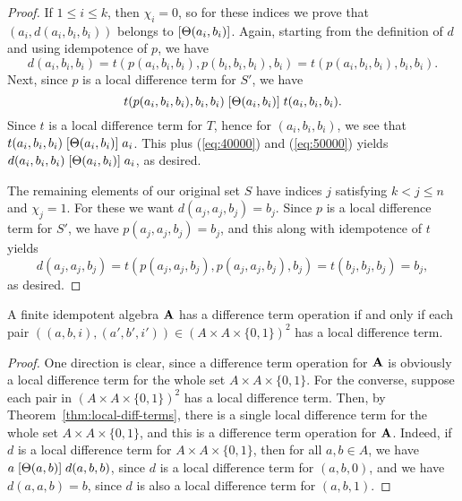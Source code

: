 \begin{proof}
If $1\leq i \leq k$, then $\chi_i =0$, so for these indices we prove
that $(a_i, d(a_i,b_i,b_i))$ belongs to $[\Theta(a_i,b_i)]$.
Again, starting from the definition of $d$ and using idempotence of $p$, we have
\begin{equation}
  \label{eq:40000}
  d(a_i,b_i,b_i) =
  t(p(a_i,b_i,b_i), p(b_i,b_i,b_i), b_i)=
  t(p(a_i,b_i,b_i), b_i, b_i).
\end{equation}
Next, since $p$ is a local difference term for $S'$, we have
\begin{equation}
  \label{eq:50000}
  t(p(a_i,b_i,b_i), b_i, b_i)
 \mathrel{[\Theta(a_i,b_i)]}
 t(a_i, b_i, b_i).
\end{equation}
Since $t$ is a local difference term for $T$, hence for
$(a_i, b_i, b_i)$,  %
we see that
$t(a_i, b_i, b_i) \mathrel{[\Theta(a_i,b_i)]} a_i$.
This plus (\ref{eq:40000}) and (\ref{eq:50000}) yields
$d(a_i,b_i,b_i) \mathrel{[\Theta(a_i,b_i)]} a_i$,
as desired.

The remaining elements of our original set $S$
have indices $j$ satisfying $k<j\leq n$ and $\chi_j = 1$.
For these we want $d(a_j,a_j,b_j) = b_j$.
Since $p$ is a local difference term for $S'$, we have
$p(a_j,a_j,b_j) = b_j$, and this along with idempotence of $t$ yields
\[ d(a_j,a_j,b_j) =  t(p(a_j,a_j,b_j), p(a_j,a_j,b_j), b_j)=  t(b_j, b_j, b_j) =b_j,\]
as desired.
\end{proof}

\begin{cor}
  \label{cor:loc-diff-term}
  A finite idempotent algebra $\mathbf{A}$ has a difference term operation if and
  only if each pair $((a,b,i), (a',b',i')) \in (A\times A \times \{0,1\})^2$ has a local
  difference term.
\end{cor}
\begin{proof}
  One direction is clear, since a difference term operation for $\mathbf{A}$ is
  obviously a local difference term for the whole set
  $A\times A \times \{0,1\}$.
  For the converse, suppose
  each pair in $(A\times A \times \{0,1\})^2$ has a local
  difference term. Then, by Theorem~\ref{thm:local-diff-terms},
  there is a single local difference term for the whole set $A\times A \times \{0,1\}$,
  and this is a difference term operation for $\mathbf{A}$.  Indeed, if $d$ is a
  local difference term for $A\times A \times \{0,1\}$, then
  for all $a, b \in A$, we have
  $a \mathrel{[\Theta(a,b)]} d(a,b,b)$,
  since $d$ is a local difference term for $(a,b,0)$, and we have
  $d(a,a,b) = b$, since $d$ is also a local difference term for
  $(a,b,1)$.
\end{proof}

